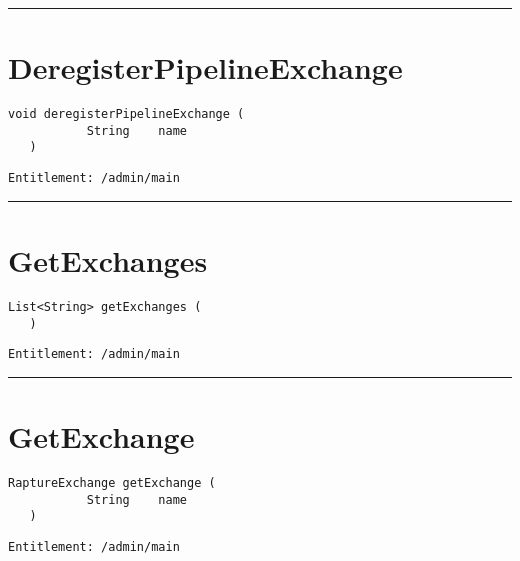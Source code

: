 \rule{12cm}{2pt}
\section{DeregisterPipelineExchange}
\label{Api:DeregisterPipelineExchange}
\begin{lstlisting}[style=nonumbers]
   void deregisterPipelineExchange (
           String    name
   )
\end{lstlisting}
\begin{Verbatim}[formatcom=\color{Maroon}]
  Entitlement: /admin/main
\end{Verbatim}



\rule{12cm}{2pt}
\section{GetExchanges}
\label{Api:GetExchanges}
\begin{lstlisting}[style=nonumbers]
   List<String> getExchanges (
   )
\end{lstlisting}
\begin{Verbatim}[formatcom=\color{Maroon}]
  Entitlement: /admin/main
\end{Verbatim}



\rule{12cm}{2pt}
\section{GetExchange}
\label{Api:GetExchange}
\begin{lstlisting}[style=nonumbers]
   RaptureExchange getExchange (
           String    name
   )
\end{lstlisting}
\begin{Verbatim}[formatcom=\color{Maroon}]
  Entitlement: /admin/main
\end{Verbatim}



